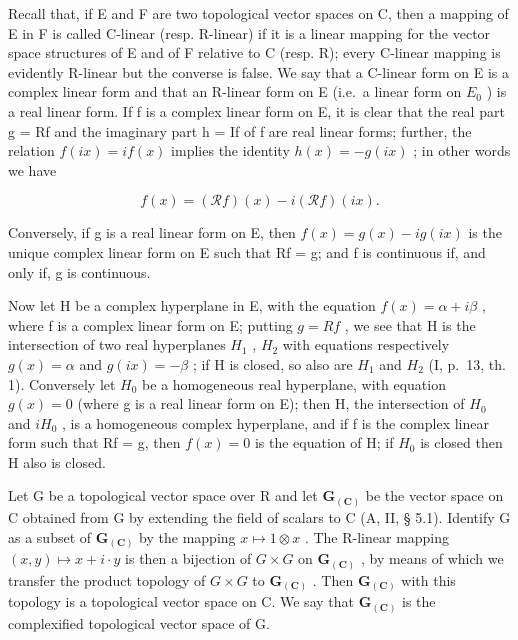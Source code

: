 Recall that, if E and F are two topological vector spaces on C, then a mapping of E in F is called C-linear (resp. R-linear) if it is a linear mapping for the vector space structures of E and of F relative to C (resp. R); every C-linear mapping is evidently R-linear but the converse is false. We say that a C-linear form on E is a complex linear form and that an R-linear form on E (i.e.~a linear form on \(E_{0}\) ) is a real linear form. If f is a complex linear form on E, it is clear that the real part g = Rf and the imaginary part h = If of f are real linear forms; further, the relation \(f(ix) = if(x)\) implies the identity \(h(x) = -g(ix)\) ; in other words we have

\[
f (x) = (\mathscr {R} f) (x) - i (\mathscr {R} f) (i x).\tag{1}
\]

Conversely, if g is a real linear form on E, then \(f(x) = g(x) - ig(ix)\) is the unique complex linear form on E such that Rf = g; and f is continuous if, and only if, g is continuous.

Now let H be a complex hyperplane in E, with the equation \(f(x) = \alpha + i\beta\) , where f is a complex linear form on E; putting \(g = Rf\) , we see that H is the intersection of two real hyperplanes \(H_{1}\) , \(H_{2}\) with equations respectively \(g(x) = \alpha\) and \(g(ix) = -\beta\) ; if H is closed, so also are \(H_{1}\) and \(H_{2}\) (I, p.~13, th. 1). Conversely let \(H_{0}\) be a homogeneous real hyperplane, with equation \(g(x) = 0\) (where g is a real linear form on E); then H, the intersection of \(H_{0}\) and \(iH_{0}\) , is a homogeneous complex hyperplane, and if f is the complex linear form such that Rf = g, then \(f(x) = 0\) is the equation of H; if \(H_{0}\) is closed then H also is closed.

Let G be a topological vector space over R and let \(\mathbf{G}_{(\mathbf{C})}\) be the vector space on C obtained from G by extending the field of scalars to C (A, II, § 5.1). Identify G as a subset of \(\mathbf{G}_{(\mathbf{C})}\) by the mapping \(x \mapsto 1 \otimes x\) . The R-linear mapping \((x, y) \mapsto x + i \cdot y\) is then a bijection of \(G \times G\) on \(\mathbf{G}_{(\mathbf{C})}\) , by means of which we transfer the product topology of \(G \times G\) to \(\mathbf{G}_{(\mathbf{C})}\) . Then \(\mathbf{G}_{(\mathbf{C})}\) with this topology is a topological vector space on C. We say that \(\mathbf{G}_{(\mathbf{C})}\) is the complexified topological vector space of G.

